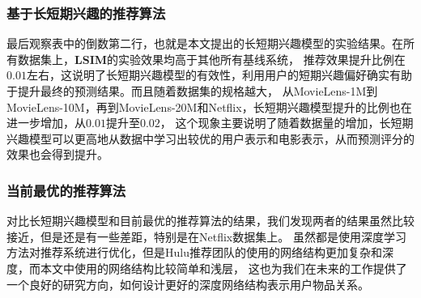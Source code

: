 \subsubsection{基于长短期兴趣的推荐算法}
最后观察表中的倒数第二行，也就是本文提出的长短期兴趣模型的实验结果。在所有数据集上，\textbf{LSIM}的实验效果均高于其他所有基线系统，
推荐效果提升比例在$0.01$左右，这说明了长短期兴趣模型的有效性，利用用户的短期兴趣偏好确实有助于提升最终的预测结果。而且随着数据集的规格越大，
从MovieLens-1M到MovieLens-10M，再到MovieLens-20M和Netflix，长短期兴趣模型提升的比例也在进一步增加，从$0.01$提升至$0.02$，
这个现象主要说明了随着数据量的增加，长短期兴趣模型可以更高地从数据中学习出较优的用户表示和电影表示，从而预测评分的效果也会得到提升。

\subsubsection{当前最优的推荐算法}
对比长短期兴趣模型和目前最优的推荐算法的结果，我们发现两者的结果虽然比较接近，但是还是有一些差距，特别是在Netflix数据集上。
虽然都是使用深度学习方法对推荐系统进行优化，但是Hulu推荐团队的使用的网络结构更加复杂和深度，而本文中使用的网络结构比较简单和浅层，
这也为我们在未来的工作提供了一个良好的研究方向，如何设计更好的深度网络结构表示用户物品关系。

